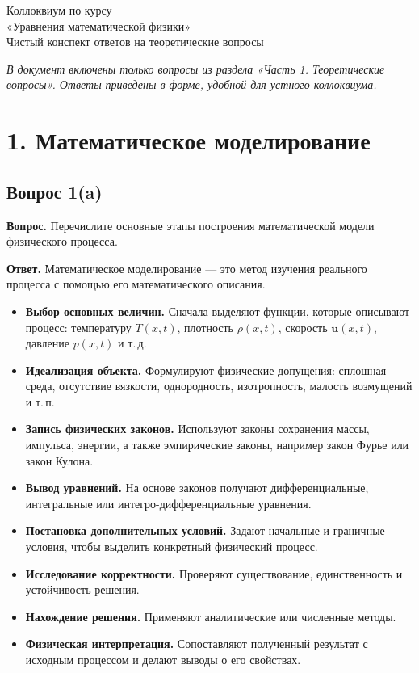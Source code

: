 \documentclass[a4paper,12pt]{article}
\newcommand{\Question}[2]{\subsection*{Вопрос #1}\textbf{Вопрос.} #2}
\newcommand{\Answer}{\textbf{Ответ.}}
\begin{document}
\begin{center}
{\LARGE Коллоквиум по курсу}\\[0.2em]
{\LARGE «Уравнения математической физики»}\\[0.8em]
{\large Чистый конспект ответов на теоретические вопросы}
\end{center}

\vspace{0.8em}
\textit{В документ включены только вопросы из раздела «Часть 1. Теоретические вопросы». Ответы приведены в форме, удобной для устного коллоквиума.}

\section*{1. Математическое моделирование}

\Question{1(a)}{Перечислите основные этапы построения математической модели физического процесса.}

\Answer
Математическое моделирование --- это метод изучения реального процесса с помощью его математического описания.

\begin{itemize}
  \item \textbf{Выбор основных величин.} Сначала выделяют функции, которые описывают процесс: температуру $T(x,t)$, плотность $\rho(x,t)$, скорость $\mathbf{u}(x,t)$, давление $p(x,t)$ и т.\,д.
  \item \textbf{Идеализация объекта.} Формулируют физические допущения: сплошная среда, отсутствие вязкости, однородность, изотропность, малость возмущений и т.\,п.
  \item \textbf{Запись физических законов.} Используют законы сохранения массы, импульса, энергии, а также эмпирические законы, например закон Фурье или закон Кулона.
  \item \textbf{Вывод уравнений.} На основе законов получают
  дифференциальные, интегральные или
  интегро-дифференциальные уравнения.
  \item \textbf{Постановка дополнительных условий.} Задают начальные и граничные условия, чтобы выделить конкретный физический процесс.
  \item \textbf{Исследование корректности.} Проверяют существование,
  единственность и устойчивость решения.
  \item \textbf{Нахождение решения.} Применяют аналитические или численные методы.
  \item \textbf{Физическая интерпретация.} Сопоставляют полученный результат с исходным процессом и делают выводы о его свойствах.
\end{itemize}
\end{document}
